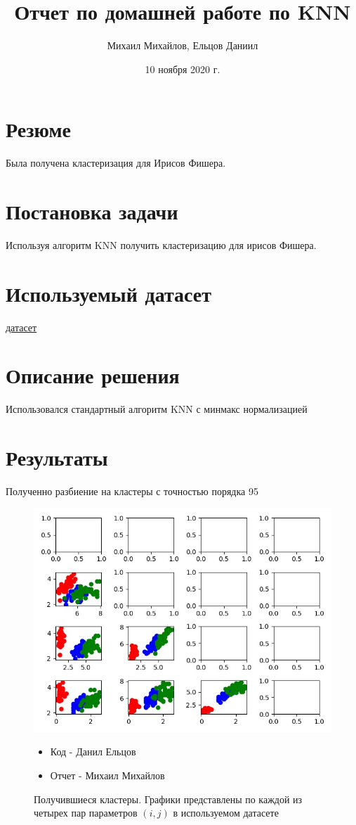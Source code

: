 \documentclass{article}
\title{Отчет по домашней работе по KNN}
\author{Михаил Михайлов, Ельцов Даниил}
\date{10 ноября 2020 г.}
\begin{document}
\maketitle
\tableofcontents

\section*{Резюме}
Была получена кластеризация для Ирисов Фишера. 
\newpage

\section{Постановка задачи}
Используя алгоритм KNN получить кластеризацию для ирисов Фишера.

\section{Используемый датасет}
\href{https://www.kaggle.com/uciml/iris}{датасет}

\section{Описание решения}
Использовался стандартный алгоритм KNN с минмакс нормализацией

\section{Результаты}
Полученно разбиение на кластеры с точностью порядка 95%

\begin{figure}[h!]
    \centering
    \includegraphics[scale=0.3]{results.jpg}
    \caption{Получившиеся кластеры. Графики представлены по каждой из четырех пар параметров \((i, j)\) в используемом датасете}

\begin{itemize}
    \item Код - Данил Ельцов
    \item Отчет - Михаил Михайлов
\end{itemize}

\end{figure}
\end{document}

